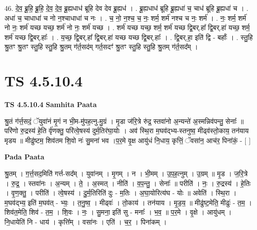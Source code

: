\documentclass[17pt]{extarticle}
\begin{document}
46. दे॒व॒ ब्रू॒हि॒ ब्रू॒हि॒ दे॒व॒ दे॒व॒ ब्रू॒ह्यधाध॑ ब्रूहि देव देव ब्रू॒ह्यध॑ । . ब्रू॒ह्यधाध॑ ब्रूहि ब्रू॒ह्यधा॑ च॒ चाध॑ ब्रूहि ब्रू॒ह्यधा॑ च । . अधा॑ च॒ चाधाधा॑ च नो न॒श्चाधाधा॑ च नः । . च॒ नो॒ न॒श्च॒ च॒ नः॒ शर्म॒ शर्म॑ नश्च च नः॒ शर्म॑ । . नः॒ शर्म॒ शर्म॑ नो नः॒ शर्म॑ यच्छ यच्छ॒ शर्म॑ नो नः॒ शर्म॑ यच्छ । . शर्म॑ यच्छ यच्छ॒ शर्म॒ शर्म॑ यच्छ द्वि॒बर्.हा᳚ द्वि॒बर्.हा॑ यच्छ॒ शर्म॒ शर्म॑ यच्छ द्वि॒बर्.हाः᳚ । . य॒च्छ॒ द्वि॒बर्.हा᳚ द्वि॒बर्.हा॑ यच्छ यच्छ द्वि॒बर्.हाः᳚ । . द्वि॒बर्.हा॒ इति॑ द्वि - बर्हाः᳚ । . स्तु॒हि श्रु॒तꣳ श्रु॒तꣳ स्तु॒हि स्तु॒हि श्रु॒तम् ग॑र्त॒सद॑म् गर्त॒सदꣳ॑ श्रु॒तꣳ स्तु॒हि स्तु॒हि श्रु॒तम् ग॑र्त॒सद᳚म् । \newline
\pagebreak
{}

\section{ TS 4.5.10.4 }

\textbf{TS 4.5.10.4 } \newline
\textbf{Samhita Paata} \newline

श्रु॒तं ग॑र्त्त॒सदं॒ ॅयुवा॑नं मृ॒गं न भी॒म-मु॑पह॒त्नु-मु॒ग्रं । मृ॒डा ज॑रि॒त्रे रु॑द्र॒ स्तवा॑नो अ॒न्यन्ते॑ अ॒स्मन्निव॑पन्तु॒ सेनाः᳚ ॥ परि॑णो रु॒द्रस्य॑ हे॒ति र्वृ॑णक्तु॒ परि॑त्वे॒षस्य॑ दुर्म॒तिर॑घा॒योः । अव॑ स्थि॒रा म॒घव॑द्भ्य-स्तनुष्व॒ मीढ्व॑स्तो॒काय॒ तन॑याय मृडय ॥ मीढु॑ष्टम॒ शिव॑तम शि॒वो नः॑ सु॒मना॑ भव ।प॒र॒मे वृ॒क्ष आयु॑धं नि॒धाय॒ कृत्तिं॒ ॅवसा॑न॒ आच॑र॒ पिना॑कं॒ - [  ] \newline

\textbf{Pada Paata} \newline

श्रु॒तम् । ग॒र्त्त॒सद॒मिति॑ गर्त्त-सद᳚म् । युवा॑नम् । मृ॒गम् । न । भी॒मम् । उ॒प॒ह॒त्नुम् । उ॒ग्रम् ॥ मृ॒ड । ज॒रि॒त्रे । रु॒द्र॒ । स्तवा॑नः । अ॒न्यम् । ते॒ । अ॒स्मत् । नीति॑ । व॒प॒न्तु॒ । सेनाः᳚ ॥ परीति॑ । नः॒ । रु॒द्रस्य॑ । हे॒तिः । वृ॒ण॒क्तु॒ । परीति॑ । त्वे॒षस्य॑ । दु॒र्म॒तिरिति॑ दुः - म॒तिः । अ॒घा॒योरित्य॑घ - योः ॥ अवेति॑ । स्थि॒रा । म॒घव॑द्भ्य॒ इति॑ म॒घव॑त् - भ्यः॒ । त॒नु॒ष्व॒ । मीढ्वः॑ । तो॒काय॑ । तन॑याय । मृ॒ड॒य॒ ॥ मीढु॑ष्ट॒मेति॒ मीढुः॑ - त॒म॒ । शिव॑त॒मेति॒ शिव॑ - त॒म॒ । शि॒वः । नः॒ । सु॒मना॒ इति॑ सु - मनाः᳚ । भ॒व॒ ॥ प॒र॒मे । वृ॒क्षे । आयु॑धम् । नि॒धायेति॑ नि - धाय॑ । कृत्ति᳚म् । वसा॑नः । एति॑ । च॒र॒ । पिना॑कम् ।  \newline
\end{document}
